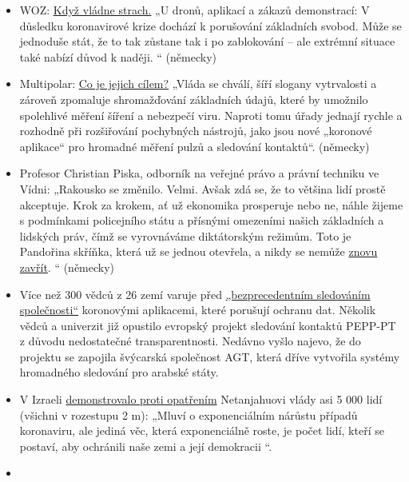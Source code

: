 \begin{itemize}
\tightlist
\item
  WOZ:
  \href{https://www.woz.ch/2016/grundrechte/wenn-die-angst-regiert}{Když
  vládne strach.} „U dronů, aplikací a zákazů demonstrací: V důsledku
  koronavirové krize dochází k porušování základních svobod. Může se
  jednoduše stát, že to tak zůstane tak i po zablokování -- ale extrémní
  situace také nabízí důvod k naději. `` (německy)
\item
  Multipolar:
  \href{https://multipolar-magazin.de/artikel/die-massnahmen-wirken}{Co
  je jejich cílem?} „Vláda se chválí, šíří slogany vytrvalosti a zároveň
  zpomaluje shromažďování základních údajů, které by umožnilo spolehlivé
  měření šíření a nebezpečí viru. Naproti tomu úřady jednají rychle a
  rozhodně při rozšiřování pochybných nástrojů, jako jsou nové „koronové
  aplikace`` pro hromadné měření pulzů a sledování kontaktů``. (německy)
\item
  Profesor Christian Piska, odborník na veřejné právo a právní techniku
  ​​ve Vídni: „Rakousko se změnilo. Velmi. Avšak zdá se, že to většina
  lidí prostě akceptuje. Krok za krokem, ať už ekonomika prosperuje nebo
  ne, náhle žijeme s podmínkami policejního státu a přísnými omezeními
  našich základních a lidských práv, čímž se vyrovnáváme diktátorským
  režimům. Toto je Pandořina skříňka, která už se jednou otevřela, a
  nikdy se nemůže
  \href{https://kurier.at/meinung/das-juristische-totschlagargument-vom-menschenleben/400814570}{znovu
  zavřít}. `` (německy)
\item
  Více než 300 vědců z 26 zemí varuje před
  \href{https://www.golem.de/news/corona-app-300-wissenschaftler-warnen-vor-zentraler-datenspeicherung-2004-147973.html}{„bezprecedentním
  sledováním společnosti``} koronovými aplikacemi, které porušují
  ochranu dat. Několik vědců a univerzit již opustilo evropský projekt
  sledování kontaktů PEPP-PT z důvodu nedostatečné transparentnosti.
  Nedávno vyšlo najevo, že do projektu se zapojila švýcarská společnost
  AGT, která dříve vytvořila systémy hromadného sledování pro arabské
  státy.
\item
  V Izraeli
  \href{https://edition.cnn.com/2020/04/20/middleeast/israel-protest-social-distancing-intl/index.html}{demonstrovalo
  proti opatřením} Netanjahuovi vlády asi 5 000 lidí (všichni v
  rozestupu 2 m): „Mluví o exponenciálním nárůstu případů koronaviru,
  ale jediná věc, která exponenciálně roste, je počet lidí, kteří se
  postaví, aby ochránili naše zemi a její demokracii ``.
\item

\end{itemize}

